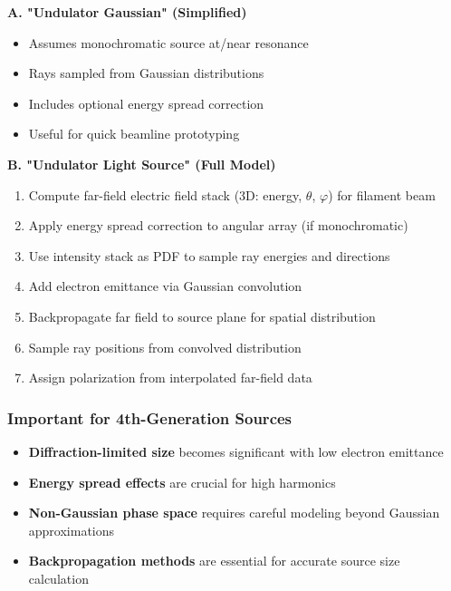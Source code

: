 \textbf{A. "Undulator Gaussian" (Simplified)}
\begin{itemize}
    \item Assumes monochromatic source at/near resonance
    \item Rays sampled from Gaussian distributions
    \item Includes optional energy spread correction
    \item Useful for quick beamline prototyping
\end{itemize}

\textbf{B. "Undulator Light Source" (Full Model)}
\begin{enumerate}
    \item Compute far-field electric field stack (3D: energy, \(\theta\), \(\varphi\)) for filament beam
    \item Apply energy spread correction to angular array (if monochromatic)
    \item Use intensity stack as PDF to sample ray energies and directions
    \item Add electron emittance via Gaussian convolution
    \item Backpropagate far field to source plane for spatial distribution
    \item Sample ray positions from convolved distribution
    \item Assign polarization from interpolated far-field data
\end{enumerate}

\subsubsection{Important for 4th-Generation Sources}

\begin{itemize}
    \item \textbf{Diffraction-limited size} becomes significant with low electron emittance
    \item \textbf{Energy spread effects} are crucial for high harmonics
    \item \textbf{Non-Gaussian phase space} requires careful modeling beyond Gaussian approximations
    \item \textbf{Backpropagation methods} are essential for accurate source size calculation
\end{itemize}


